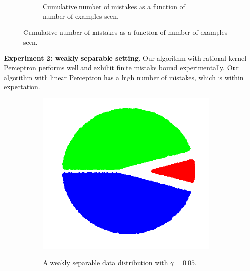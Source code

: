 \documentclass[landscape,a0a,final]{a0poster}
\begin{document}
\begin{multicols}{3}
\begin{figure}[H]
\begin{subfigure}[b]{0.20\textwidth}
\captionsetup{justification=centering}
\caption{Cumulative number of mistakes as a function of number of examples seen.}
\end{subfigure}
\captionsetup{justification=centering}
\label{figure:strongly-and-weakly-separable-datasets}
\end{figure}
\begin{flushleft}
\textbf{Experiment 2: weakly separable setting.} Our algorithm with rational kernel Perceptron
performs well and exhibit finite mistake bound experimentally.
Our algorithm with linear Perceptron has a high number of mistakes, which is within
expectation.
\end{flushleft}
\begin{figure}[H]
\centering
\begin{subfigure}[b]{0.08\textwidth}
\captionsetup{justification=centering}
\begin{center}
\includegraphics[width=\textwidth, trim={0, 0cm, 0, 0}, clip]{figures/weak_points}
\label{figure:weakly-separable-dataset}
\caption{A weakly separable data distribution with $\gamma = 0.05$.}
\end{center}
\end{subfigure}
\hfill
\begin{subfigure}[b]{0.20\textwidth}

\end{subfigure}
\end{figure}
\end{multicols}
\end{document}
